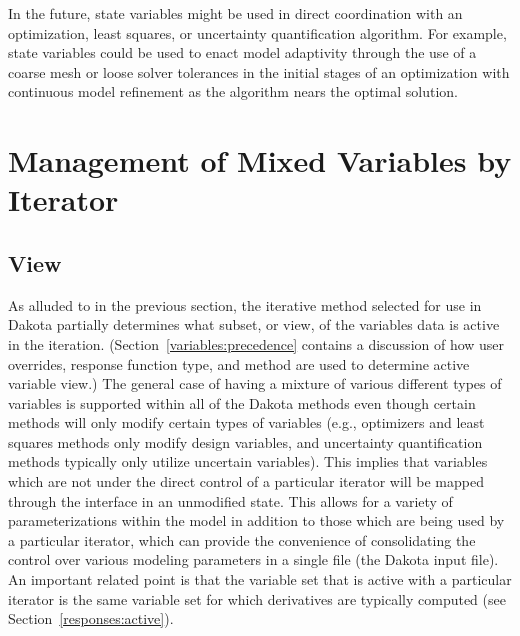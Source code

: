 In the future, state variables might be used in direct coordination
with an optimization, least squares, or uncertainty quantification
algorithm. For example, state variables could be used to enact model
adaptivity through the use of a coarse mesh or loose solver tolerances
in the initial stages of an optimization with continuous model
refinement as the algorithm nears the optimal solution.

\section{Management of Mixed Variables by Iterator}\label{variables:mixed}

\subsection{View}\label{variables:mixedview}
As alluded to in the previous section, the iterative method selected
for use in Dakota partially determines what subset, or view, 
of the variables data is active in the iteration. 
(Section~\ref{variables:precedence} contains a discussion of
how user overrides, response function type, and method are used to determine 
active variable view.) The general case of having 
a mixture of various different types of variables is supported 
within all of the Dakota methods even though certain methods will 
only modify certain types of variables (e.g., optimizers and least squares 
methods only modify design variables, and uncertainty quantification methods 
typically only utilize uncertain variables).  This implies that variables 
which are not under the direct control of a particular iterator will be 
mapped through the interface in an unmodified state. This allows for a 
variety of parameterizations within the model in addition to those which are
being used by a particular iterator, which can provide the convenience
of consolidating the control over various modeling parameters in a
single file (the Dakota input file). An important related point is
that the variable set that is active with a particular iterator is the
same variable set for which derivatives are typically computed (see
Section~\ref{responses:active}).

